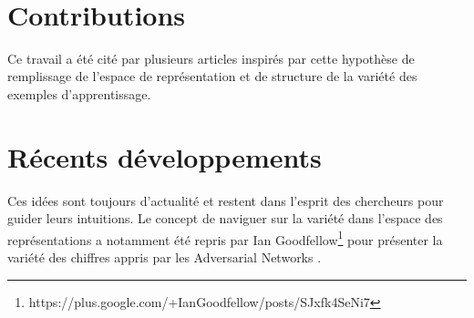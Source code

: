 \begin{center}
 \end{center}

\begin{center}
\\
\end{center} 

\section{Contributions}

Ce travail a été cité par plusieurs articles
inspirés par cette hypothèse de remplissage de l'espace de représentation et de
structure de la variété des exemples d'apprentissage. 

\section{R\'{e}cents d\'{e}veloppements}

Ces idées sont toujours d'actualité et restent dans l'esprit des chercheurs
pour guider leurs intuitions. Le concept de naviguer sur la variété dans l'espace des
représentations a notamment été repris par Ian
Goodfellow\footnote{https://plus.google.com/+IanGoodfellow/posts/SJxfk4SeNi7}
pour présenter la variété des chiffres appris par les Adversarial Networks
\citep{Goodfellow-et-al-ARXIV2014}.

